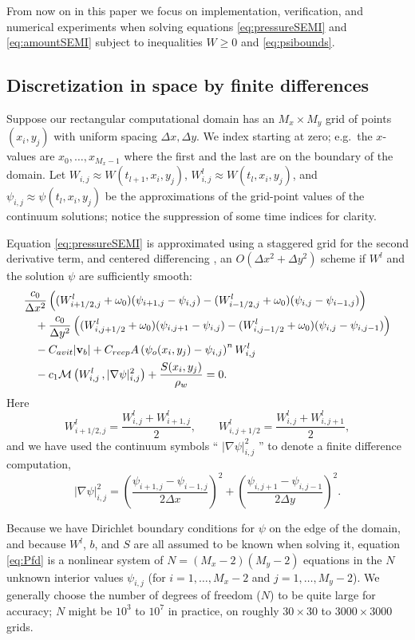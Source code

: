 \documentclass[11pt]{amsart}
\newcommand{\psiij}{\psi_{i,j}}
\newcommand{\Wlij}{W^l_{i,j}}
\newcommand{\Wij}{W_{i,j}}
\newcommand{\bv}{\mathbf{v}}
\newcommand{\Cavit}{C_{avit}}
\newcommand{\Creep}{C_{reep}}
\begin{document}
From now on in this paper we focus on implementation, verification, and numerical experiments when solving equations \eqref{eq:pressureSEMI} and \eqref{eq:amountSEMI} subject to inequalities $W\ge 0$ and \eqref{eq:psibounds}.


\subsection*{Discretization in space by finite differences}  Suppose our rectangular computational domain has an $M_x \times M_y$ grid of points $(x_i,y_j)$ with uniform spacing $\Delta x,\Delta y$.  We index starting at zero; e.g.~the $x$-values are $x_0,\dots,x_{M_x-1}$ where the first and the last are on the boundary of the domain.  Let $\Wij \approx W(t_{l+1},x_i,y_j)$, $\Wlij \approx W(t_l,x_i,y_j)$, and $\psiij \approx \psi(t_l,x_i,y_j)$ be the approximations of the grid-point values of the continuum solutions; notice the suppression of some time indices for clarity.

Equation \eqref{eq:pressureSEMI} is approximated using a staggered grid for the second derivative term, and centered differencing \citep{MortonMayers}, an $O(\Delta x^2 + \Delta y^2)$ scheme if $W^l$ and the solution $\psi$ are sufficiently smooth:
\begin{align} 
&\frac{c_0}{\Delta x^2} \left((W^l_{i+1/2,j}+\omega_0) (\psi_{i+1,j} - \psiij) - (W^l_{i-1/2,j}+\omega_0) (\psiij - \psi_{i-1,j})\right) \label{eq:Pfd} \\
&\quad + \frac{c_0}{\Delta y^2} \left((W^l_{i,j+1/2}+\omega_0) (\psi_{i,j+1} - \psiij) - (W^l_{i,j-1/2}+\omega_0) (\psiij - \psi_{i,j-1})\right) \notag \\
&\quad -\Cavit |\bv_b| + \Creep A \left(\psi_o(x_i,y_j) - \psiij\right)^n \Wlij \notag \\
&\quad - c_1 \mathcal{M}\left(\Wlij \,,|\nabla \psi|_{i,j}^2\right) + \frac{S(x_i,y_j)}{\rho_w} = 0. \notag
\end{align}
Here
	$$W^l_{i+1/2,j} = \frac{\Wlij+W^l_{i+1,j}}{2}, \qquad W^l_{i,j+1/2} = \frac{\Wlij+W^l_{i,j+1}}{2},$$
and we have used the continuum symbols `` $|\nabla \psi|_{i,j}^2$ '' to denote a finite difference computation,
\begin{equation}\label{dpsisqr}
|\nabla \psi|_{i,j}^2 = \left(\frac{\psi_{i+1,j}-\psi_{i-1,j}}{2\Delta x}\right)^2 + \left(\frac{\psi_{i,j+1}-\psi_{i,j-1}}{2\Delta y}\right)^2.
\end{equation}

Because we have Dirichlet boundary conditions for $\psi$ on the edge of the domain, and because $W^l$, $b$, and $S$ are all assumed to be known when solving it, equation \eqref{eq:Pfd} is a nonlinear system of $N=(M_x-2)(M_y-2)$ equations in the $N$ unknown interior values $\psiij$ (for $i=1,\dots,M_x-2$ and $j=1,\dots,M_y-2$).  We generally choose the number of degrees of freedom ($N$) to be quite large for accuracy; $N$ might be $10^3$ to $10^7$ in practice, on roughly $30\times 30$ to $3000\times 3000$ grids.
\end{document}
